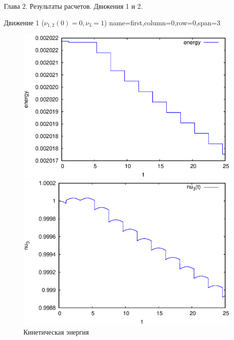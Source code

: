 \begin{myposter}{
    Глава 2. Результаты расчетов. Движения 1 и 2.
}

    \headerbox
    {Движение 1 ($\nu_{1,2}(0) = 0, \nu_3 = 1$)}
    {name=first,column=0,row=0,span=3}
    {
        {\huge\bf
            \vspace{10pt}
            \begin{figure}[H]
                \centering
                    \centering
                    \includegraphics[width=\linewidth]{content/pic/self_rot_25/kin_en.eps}
                    \vspace{-15pt}
                    \caption{Кинетическая энергия}
                \endminipage
                    \centering
                    \includegraphics[width=\linewidth]{content/pic/self_rot_25/nu3.eps}

\end{figure}}}
\end{myposter}
